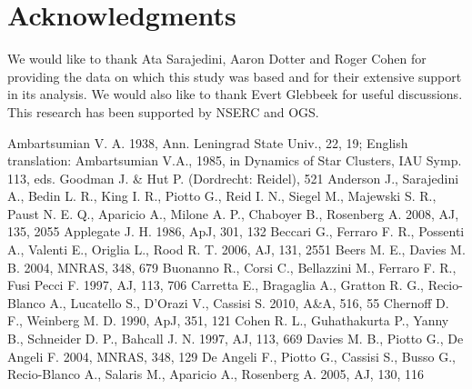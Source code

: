 \section*{Acknowledgments}

We would like to thank Ata Sarajedini, Aaron Dotter and Roger Cohen
for providing the data on which this study was based and for their
extensive support in its analysis.  We would also like to thank Evert
Glebbeek for useful discussions.  This research has been
supported by NSERC and OGS.


\begin{thebibliography}{99}

  Ambartsumian V. A. 1938, Ann. Leningrad State Univ., 22, 19; English
  translation: Ambartsumian V.A., 1985, in Dynamics of Star Clusters, IAU Symp. 113,
eds. Goodman J. \& Hut P. (Dordrecht: Reidel), 521
  Anderson J.,  Sarajedini A., Bedin L. R., King I. R., Piotto G.,
  Reid I. N., Siegel M., Majewski S. R., Paust N. E. Q., Aparicio A.,
  Milone A. P., Chaboyer B., Rosenberg A. 2008, AJ, 135, 2055
  Applegate J. H. 1986, ApJ, 301, 132
  Beccari G., Ferraro F. R., Possenti A., Valenti E., Origlia L., Rood
  R. T. 2006, AJ, 131, 2551
  Beers M. E., Davies M. B. 2004, MNRAS, 348, 679
  Buonanno R., Corsi C., Bellazzini M., Ferraro F. R., Fusi Pecci F.
  1997, AJ, 113, 706
 Carretta E., Bragaglia A., Gratton R. G., Recio-Blanco A., Lucatello
 S., D'Orazi V., Cassisi S. 2010, A\&A, 516, 55 
 Chernoff D. F., Weinberg M. D. 1990,
  ApJ, 351, 121
 Cohen
  R. L., Guhathakurta P., Yanny B., Schneider D. P., Bahcall
  J. N. 1997, AJ, 113, 669
 Davies M. B., Piotto G., De Angeli
  F. 2004, MNRAS, 348, 129
  De Angeli F., Piotto G., Cassisi S., Busso G., Recio-Blanco A.,
  Salaris M., Aparicio A., Rosenberg A. 2005, AJ, 130, 116

\end{thebibliography}
